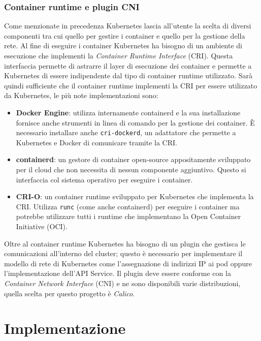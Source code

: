 \documentclass[12pt,a4paper,openright,twoside]{book}
\begin{document}
\subsection{Container runtime e plugin CNI}
%
%
Come menzionate in precedenza Kubernetes lascia all'utente la scelta di diversi componenti tra cui quello per gestire i container e quello per la gestione della rete\cite{kubernetes}.
Al fine di eseguire i container Kubernetes ha bisogno di un ambiente di esecuzione che implementi la \textit{Container Runtime Interface} (CRI).
Questa interfaccia permette di astrarre il layer di esecuzione dei container e permette a Kubernetes di essere indipendente dal tipo di container runtime utilizzato. 
Sarà quindi sufficiente che il container runtime implementi la CRI per essere utilizzato da Kubernetes, le più note implementazioni sono:
\begin{itemize}
    \item \textbf{Docker Engine}: utilizza internamente containerd e la sua installazione fornisce anche strumenti in linea di comando per la gestione dei container. 
        È necessario installare anche \texttt{cri-dockerd}, un adattatore che permette a Kubernetes e Docker di comunicare tramite la CRI.
    \item \textbf{containerd}: un gestore di container open-source appositamente sviluppato per il cloud che non necessita di nessun componente aggiuntivo. 
        Questo si interfaccia col sistema operativo per eseguire i container.
    \item \textbf{CRI-O}: un container runtime sviluppato per Kubernetes che implementa la CRI. Utilizza \texttt{runc} (come anche containerd) per eseguire i container ma potrebbe utilizzare
        tutti i runtime che implementano la Open Container Initiative (OCI).
\end{itemize}
Oltre al container runtime Kubernetes ha bisogno di un plugin che gestisca le comunicazioni all'interno del cluster; questo è
necessario per implementare il modello di rete di Kubernetes come l'assegnazione di indirizzi IP ai pod oppure l'implementazione dell'API Service.
Il plugin deve essere conforme con la \textit{Container Network Interface} (CNI) e ne sono disponibili varie distribuzioni, quella scelta per questo progetto è
\textit{Calico}.
%
\chapter{Implementazione}
\end{document}
